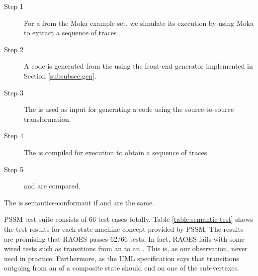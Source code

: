 \begin{description}
	\item[Step 1] For a  from the Moka example set, we simulate its execution by using Moka to extract a sequence of traces .
	
	\item[Step 2] A  code is generated from the  using the front-end generator implemented in Section \ref{subsubsec:gen}.
	
	\item[Step 3] The  is used as input for generating a  code using the source-to-source transformation.
	
	\item[Step 4] The  is compiled for execution to obtain a sequence of traces .
	
	\item[Step 5]  and  are compared.  
\end{description}

The  is semantics-conformant if  and  are the same.




PSSM test suite consists of 66 test cases totally.
Table \ref{table:semantic-test} shows the test results for each state machine concept provided by PSSM. 
The results are promising that RAOES passes 62/66 tests. 
In fact, RAOES fails with some wired tests such as transitions from an  to an . 
This is, as our observation, never used in practice. 
Furthermore, as the UML specification says that transitions outgoing from an  of a composite state should end on one of the sub-vertexes.

